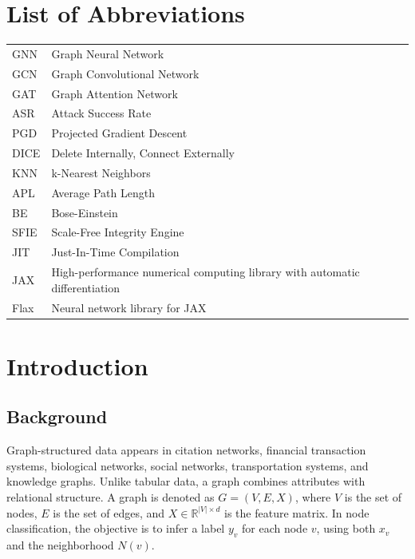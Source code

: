 \documentclass[12pt,oneside]{report}
\begin{document}
\tableofcontents
\listoftables
\listoffigures

\chapter*{List of Abbreviations}
\begin{longtable}{p{1.2in}p{4.2in}}
GNN & Graph Neural Network\\
GCN & Graph Convolutional Network\\
GAT & Graph Attention Network\\
ASR & Attack Success Rate\\
PGD & Projected Gradient Descent\\
DICE & Delete Internally, Connect Externally\\
KNN & k-Nearest Neighbors\\
APL & Average Path Length\\
BE & Bose-Einstein\\
SFIE & Scale-Free Integrity Engine\\
JIT & Just-In-Time Compilation\\
JAX & High-performance numerical computing library with automatic differentiation\\
Flax & Neural network library for JAX\\
\end{longtable}

\clearpage
{}

\chapter{Introduction}
\section{Background}
Graph-structured data appears in citation networks, financial transaction systems, biological networks, social networks, transportation systems, and knowledge graphs. Unlike tabular data, a graph combines attributes with relational structure. A graph is denoted as \(G=(V,E,X)\), where \(V\) is the set of nodes, \(E\) is the set of edges, and \(X \in \mathbb{R}^{|V|\times d}\) is the feature matrix. In node classification, the objective is to infer a label \(y_v\) for each node \(v\), using both \(x_v\) and the neighborhood \(N(v)\).
\end{document}
